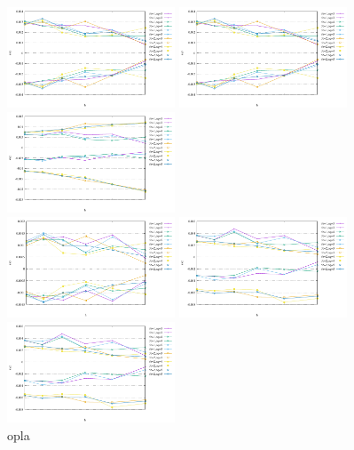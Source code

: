 \begin{center}
\includegraphics[width=5cm]{python_codes/fieldstone_75/results/exx.pdf}
\includegraphics[width=5cm]{python_codes/fieldstone_75/results/eyy.pdf}
\includegraphics[width=5cm]{python_codes/fieldstone_75/results/ezz.pdf}\\
\includegraphics[width=5cm]{python_codes/fieldstone_75/results/exy.pdf}
\includegraphics[width=5cm]{python_codes/fieldstone_75/results/exz.pdf}
\includegraphics[width=5cm]{python_codes/fieldstone_75/results/eyz.pdf}\\
{\captionfont opla  }
\end{center}






